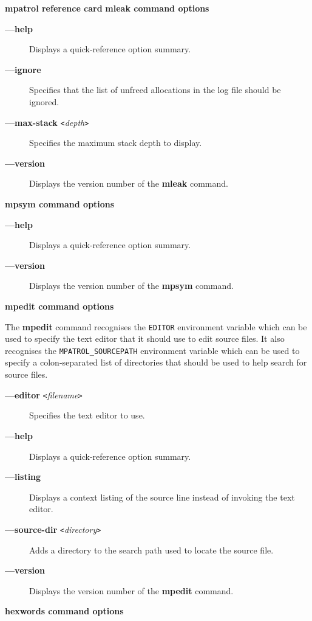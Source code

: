 \documentclass[a4paper,landscape,final]{article}
\newcommand{\heading}[1]{\textbf{\normalsize #1}}
\newcommand{\command}[1]{\textbf{#1}}
\newcommand{\flag}[1]{\textbf{---#1}}
\newcommand{\flagpar}[2]{\flag{#1} \texttt{<}\textit{#2}\texttt{>}}
\begin{document}
\begin{multicols}{3}{\textbf{\Large mpatrol reference card}}
\vskip 12pt
\heading{mleak command options}
\vskip 6pt

\begin{description}
\item[\flag{help}]
Displays a quick-reference option summary.
\item[\flag{ignore}]
Specifies that the list of unfreed allocations in the log file should be
ignored.
\item[\flagpar{max-stack}{depth}]
Specifies the maximum stack depth to display.
\item[\flag{version}]
Displays the version number of the \command{mleak} command.
\end{description}

\vskip 12pt
\heading{mpsym command options}
\vskip 6pt

\begin{description}
\item[\flag{help}]
Displays a quick-reference option summary.
\item[\flag{version}]
Displays the version number of the \command{mpsym} command.
\end{description}

\vskip 12pt
\heading{mpedit command options}
\vskip 6pt

The \command{mpedit} command recognises the \texttt{EDITOR} environment variable
which can be used to specify the text editor that it should use to edit source
files.  It also recognises the \texttt{MPATROL\_SOURCEPATH} environment variable
which can be used to specify a colon-separated list of directories that should
be used to help search for source files.

\begin{description}
\item[\flagpar{editor}{filename}]
Specifies the text editor to use.
\item[\flag{help}]
Displays a quick-reference option summary.
\item[\flag{listing}]
Displays a context listing of the source line instead of invoking the text
editor.
\item[\flagpar{source-dir}{directory}]
Adds a directory to the search path used to locate the source file.
\item[\flag{version}]
Displays the version number of the \command{mpedit} command.
\end{description}

\vskip 12pt
\heading{hexwords command options}
\vskip 6pt


\end{multicols}
\end{document}
